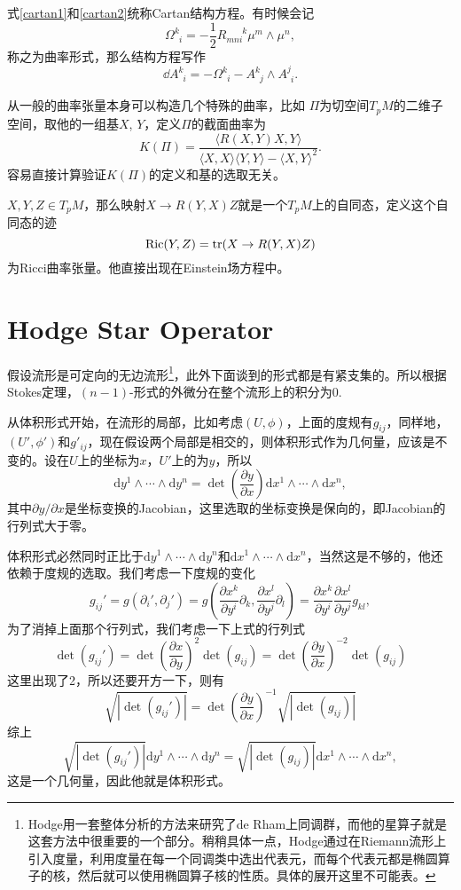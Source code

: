 式\eqref{cartan1}和\eqref{cartan2}统称Cartan结构方程。有时候会记
\[
	\Omega^{k}_{\phantom{k}i}=-\frac{1}{2}R_{mni}^{\phantom{mni}k} \mu^m\wedge\mu^n,
\]
称之为曲率形式，那么结构方程写作
\[
	\dd A^{k}_{\phantom{k}i}=-\Omega^{k}_{\phantom{k}i}-A^{k}_{\phantom{k}j}\wedge A^{j}_{\phantom{j}i}.
\]

从一般的曲率张量本身可以构造几个特殊的曲率，比如
\para $\Pi$为切空间$T_pM$的二维子空间，取他的一组基$X$, $Y$，定义$\Pi$的截面曲率为
\[
	K(\Pi)=\frac{\langle R(X,Y)X,Y\rangle}{\langle X,X\rangle\langle Y,Y \rangle-\langle X,Y \rangle^2}.
\]
容易直接计算验证$K(\Pi)$的定义和基的选取无关。

\para $X,Y,Z\in T_p M$，那么映射$X\to R(Y,X)Z$就是一个$T_p M$上的自同态，定义这个自同态的迹
\[
	\mathrm{Ric}(Y,Z)=\operatorname{tr} (X\to R(Y,X)Z)
\]
为Ricci曲率张量。他直接出现在Einstein场方程中。

\section{Hodge Star Operator}

假设流形是可定向的无边流形\footnote{Hodge用一套整体分析的方法来研究了de Rham上同调群，而他的星算子就是这套方法中很重要的一个部分。稍稍具体一点，Hodge通过在Riemann流形上引入度量，利用度量在每一个同调类中选出代表元，而每个代表元都是椭圆算子的核，然后就可以使用椭圆算子核的性质。具体的展开这里不可能表。}，此外下面谈到的形式都是有紧支集的。所以根据Stokes定理，$(n-1)$-形式的外微分在整个流形上的积分为0.

从体积形式开始，在流形的局部，比如考虑$(U,\phi)$，上面的度规有$g_{ij}$，同样地，$(U',\phi')$和$g'_{ij}$，现在假设两个局部是相交的，则体积形式作为几何量，应该是不变的。设在$U$上的坐标为$x$，$U'$上的为$y$，所以
\[
	\mathrm{d}y^1\wedge \cdots \wedge\mathrm{d}y^n=\det\left(\frac{\partial y}{\partial x}\right)\mathrm{d}x^1\wedge \cdots \wedge \mathrm{d}x^n,
\]
其中$\partial y/\partial x$是坐标变换的Jacobian，这里选取的坐标变换是保向的，即Jacobian的行列式大于零。

体积形式必然同时正比于$\mathrm{d}y^1\wedge \cdots \wedge \mathrm{d}y^n$和$\mathrm{d}x^1\wedge \cdots \wedge \mathrm{d}x^n$，当然这是不够的，他还依赖于度规的选取。我们考虑一下度规的变化
\[
	g_{ij}'=g(\partial_i',\partial_j')=g\left(\frac{\partial x^k}{\partial y^i}\partial_k,\frac{\partial x^l}{\partial y^j}\partial_l\right)=\frac{\partial x^k}{\partial y^i}\frac{\partial x^l}{\partial y^j}g_{kl},
\]
为了消掉上面那个行列式，我们考虑一下上式的行列式
\[
	\det(g_{ij}')=\det\left(\frac{\partial x}{\partial y}\right)^2\det(g_{ij})=\det\left(\frac{\partial y}{\partial x}\right)^{-2}\det(g_{ij})
\]
这里出现了2，所以还要开方一下，则有
\[
	\sqrt{|\det(g_{ij}')|}=\det\left(\frac{\partial y}{\partial x}\right)^{-1}\sqrt{|\det(g_{ij})|}
\]
综上
\[
	\sqrt{|\det(g_{ij}')|}\mathrm{d}y^1\wedge \cdots \wedge \mathrm{d}y^n=\sqrt{|\det(g_{ij})|}\mathrm{d}x^1\wedge \cdots \wedge \mathrm{d}x^n,
\]
这是一个几何量，因此他就是体积形式。


